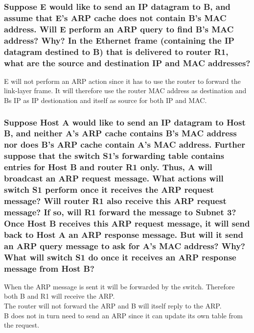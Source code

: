 \documentclass[12pt, a4paper]{article}
\begin{document}
			\subsubsection{Suppose E would like to send an IP datagram to B, and assume that E’s ARP cache does not contain B’s MAC address. Will E perform an ARP query to find B’s MAC address? Why? In the Ethernet frame (containing the IP datagram destined to B) that is delivered to router R1, what are the source and destination IP and MAC addresses?}
				E will not perform an ARP action since it has to use the router to forward the link-layer frame. It will therefore use the router MAC address as destination and Bs IP as IP destionation and itself as source for both IP and MAC.
			\subsubsection{ Suppose Host A would like to send an IP datagram to Host B, and neither A’s ARP cache contains B’s MAC address nor does B’s ARP cache contain A’s MAC address. Further suppose that the switch S1’s forwarding table contains entries for Host B and router R1 only. Thus, A will broadcast an ARP request message. What actions will switch S1 perform once it receives the ARP request message? Will router R1 also receive this ARP request message? If so, will R1 forward the message to Subnet 3? Once Host B receives this ARP request message, it will send back to Host A an ARP response message. But will it send an ARP query message to ask for A’s MAC address? Why? What will switch S1 do once it receives an ARP response message from Host B?}
				When the ARP message is sent it will be forwarded by the switch. Therefore both B and R1 will receive the ARP.\\
				The router will not forward the ARP and B will itself reply to the ARP.\\
				B does not in turn need to send an ARP since it can update its own table from the request.
\end{document}
